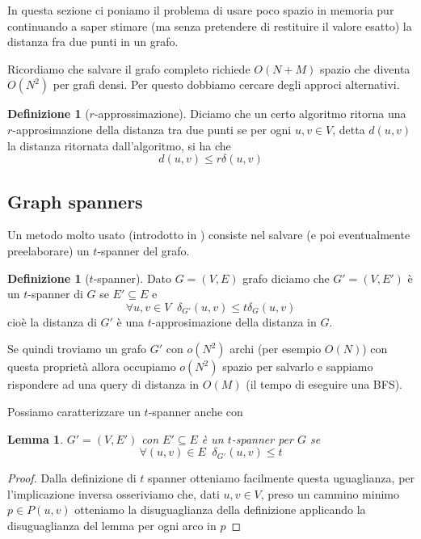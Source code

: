 \documentclass[a4paper,10pt]{amsbook}
\newcounter{counter1}
\theoremstyle{plain}
\newtheorem{mylem}[counter1]{Lemma}
\theoremstyle{definition}
\newtheorem{mydef}[counter1]{Definizione}
\theoremstyle{remark}
\newcommand{\pa}[1]{\left(#1\right)}
\begin{document}
In questa sezione ci poniamo il problema di usare poco spazio in
memoria pur continuando a saper stimare (ma senza pretendere di
restituire il valore esatto) la distanza fra due punti in un grafo.

Ricordiamo che salvare il grafo completo richiede $O\pa{ N + M }$
spazio che diventa $O\pa{ N^2}$ per grafi densi. Per questo dobbiamo
cercare degli approci alternativi.

\begin{mydef}[$r$-approssimazione]
  Diciamo che un certo algoritmo ritorna una $r$-approsimazione della
  distanza tra due punti se per ogni $u,v \in V$, detta $d(u,v)$ la
  distanza ritornata dall'algoritmo, si ha che
  \[ d\pa{u,v} \le r \delta\pa{u,v} \]
\end{mydef}

\subsection{Graph spanners}

Un metodo molto usato (introdotto in \cite{graphspanners}) consiste
nel salvare (e poi eventualmente preelaborare) un $t$-spanner del
grafo.

\begin{mydef}[$t$-spanner]
  Dato $G = (V,E)$ grafo diciamo che $G' = (V, E')$ \`e un $t$-spanner
  di $G$ se $E' \subseteq E$ e
  \[ \forall u,v \in V \;\; \delta _{G'} \pa{ u,v} \le t \delta _{G}
    \pa{ u,v} \]
  cio\`e la distanza di $G'$ \`e una $t$-approsimazione della distanza
  in $G$.
\end{mydef}

Se quindi troviamo un grafo $G'$ con $o\pa{ N^2}$ archi (per esempio
$O(N)$) con questa propriet\`a allora occupiamo $o(N^2)$
spazio per salvarlo e sappiamo rispondere ad una query di distanza in
$O(M)$ (il tempo di eseguire una BFS).

Possiamo caratterizzare un $t$-spanner anche con
\begin{mylem}
  $G' = (V,E')$ con $E' \subseteq E$ \`e un $t$-spanner per $G$ se
  \[ \forall (u,v) \in E\;\; \delta_{G'} (u,v) \le t \]
\end{mylem}
\begin{proof}
  Dalla definizione di $t$ spanner otteniamo facilmente questa
  uguaglianza, per l'implicazione inversa osseriviamo che, dati $u,v
  \in V$, preso un cammino minimo $p \in P(u,v)$ otteniamo la
  disuguaglianza della definizione applicando la disuguaglianza del
  lemma per ogni arco in $p$
\end{proof}
\end{document}
